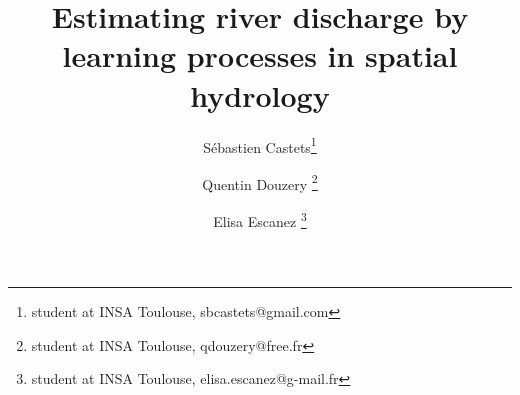\documentclass[a4paper,11pt,twosideX,onefignum,onetabnum]{siamart190516}
\begin{document}
\title{Estimating river discharge by learning processes in spatial hydrology}
\author{Sébastien Castets\thanks{student at INSA Toulouse, sbcastets@gmail.com}\and Quentin Douzery \thanks{student at INSA Toulouse, qdouzery@free.fr }\and Elisa Escanez \thanks{student at INSA Toulouse, elisa.escanez@g-mail.fr} }


\maketitle


\newpage



\newpage




% 
% 
\end{document}
